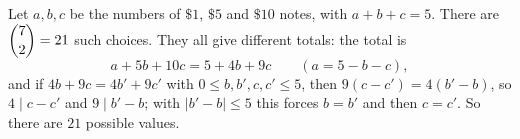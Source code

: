 Let $a,b,c$ be the numbers of $\$1$, $\$5$ and $\$10$ notes, with $a+b+c=5$. There are $\dbinom{7}{2}=21$ such choices. They all give different totals: the total is
\[
a+5b+10c=5+4b+9c\qquad(a=5-b-c),
\]
and if $4b+9c=4b'+9c'$ with $0\le b,b',c,c'\le5$, then $9(c-c')=4(b'-b)$, so $4\mid c-c'$ and $9\mid b'-b$; with $|b'-b|\le5$ this forces $b=b'$ and then $c=c'$. So there are $\boxed{21}$ possible values.
